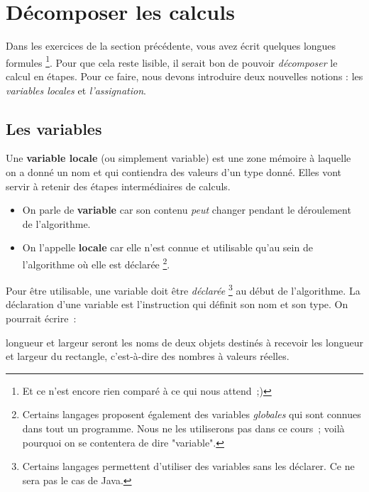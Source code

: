 	\section{Décomposer les calculs}
	
		Dans les exercices de la section précédente,
		vous avez écrit quelques longues formules%
		\footnote{%
			Et ce n’est encore rien comparé à ce qui nous attend~;)%
		}.
		Pour que cela reste lisible,
		il serait bon de pouvoir \emph{décomposer}
		le calcul en étapes.
		Pour ce faire, nous devons introduire deux nouvelles notions :
		les \emph{variables locales} et \emph{l’assignation}.
		
		\subsection{Les variables}
		
			Une \textbf{variable locale} (ou simplement variable)
			est une zone mémoire à laquelle on a donné un nom
			et qui contiendra des valeurs d’un type donné.
			Elles vont servir à retenir des étapes intermédiaires
			de calculs.
			\begin{itemize}
			\item
				On parle de \textbf{variable}
				car son contenu \emph{peut} changer
				pendant le déroulement de l’algorithme.
			\item
				On l’appelle \textbf{locale}
				car elle n’est connue et utilisable qu’au sein
				de l’algorithme où elle est déclarée%
				\footnote{%
					Certains langages proposent également des variables
					\emph{globales} qui sont connues dans tout un programme.
					Nous ne les utiliserons pas dans ce cours~;
					voilà pourquoi on se contentera de dire "variable".%
				}.
			\end{itemize}		
			Pour être utilisable, 
			une variable doit être \emph{déclarée}%
			\footnote{%
				Certains langages permettent 
				d’utiliser des variables sans les déclarer.
				Ce ne sera pas le cas de Java.
			}
			au début de l’algorithme. 	
			La déclaration d’une variable 
			est l’instruction qui définit son nom et son type. 
			On pourrait écrire~:
	
			\begin{LDA}
				\Stmt longueur et largeur seront les noms de deux objets destinés à recevoir
				\Stmt les longueur et largeur du rectangle, c’est-à-dire des nombres à valeurs réelles.
			\end{LDA}
			
